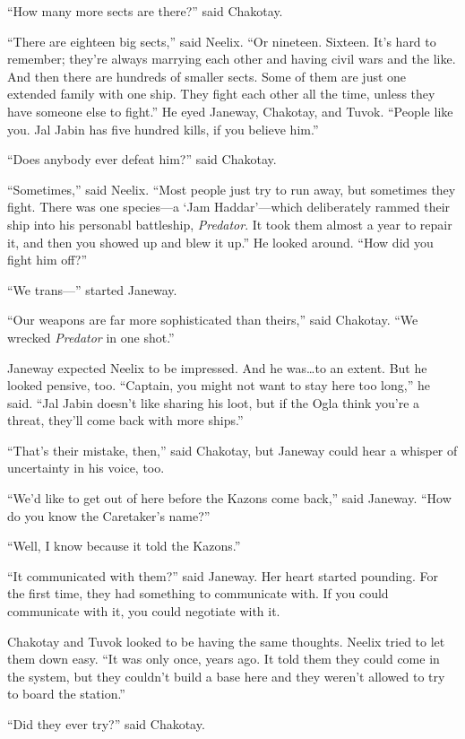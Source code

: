 \documentclass[twoside,letterpaper,12pt]{memoir}
\begin{document}
``How many more sects are there?'' said Chakotay.

``There are eighteen big sects,'' said Neelix. ``Or nineteen. Sixteen. It's hard to remember; they're always marrying each other and having civil wars and the like. And then there are hundreds of smaller sects. Some of them are just one extended family with one ship. They fight each other all the time, unless they have someone else to fight.'' He eyed Janeway, Chakotay, and Tuvok. ``People like you. Jal Jabin has five hundred kills, if you believe him.''

``Does anybody ever defeat him?'' said Chakotay.

``Sometimes,'' said Neelix. ``Most people just try to run away, but sometimes they fight. There was one species---a `Jam Haddar'---which deliberately rammed their ship into his personabl battleship, \textit{Predator}. It took them almost a year to repair it, and then you showed up and blew it up.'' He looked around. ``How did you fight him off?''

``We trans---'' started Janeway.

``Our weapons are far more sophisticated than theirs,'' said Chakotay. ``We wrecked \textit{Predator} in one shot.''

Janeway expected Neelix to be impressed. And he was\ldots to an extent. But he looked pensive, too. ``Captain, you might not want to stay here too long,'' he said. ``Jal Jabin doesn't like sharing his loot, but if the Ogla think you're a threat, they'll come back with more ships.''

``That's their mistake, then,'' said Chakotay, but Janeway could hear a whisper of uncertainty in his voice, too.

``We'd like to get out of here before the Kazons come back,'' said Janeway. ``How do you know the Caretaker's name?''

``Well, I know because it told the Kazons.''

``It communicated with them?'' said Janeway. Her heart started pounding. For the first time, they had something to communicate with. If you could communicate with it, you could negotiate with it.

Chakotay and Tuvok looked to be having the same thoughts. Neelix tried to let them down easy. ``It was only once, years ago. It told them they could come in the system, but they couldn't build a base here and they weren't allowed to try to board the station.''

``Did they ever try?'' said Chakotay.
\end{document}
